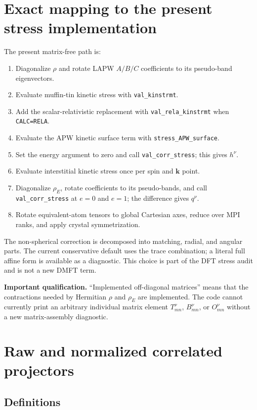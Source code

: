\documentclass[11pt]{article}
\numberwithin{equation}{section}
\newcommand{\kb}{\mathbf k}
\newcommand{\code}[1]{\texttt{#1}}
\newcommand{\status}[2]{\par\medskip\noindent\colorbox{#1}{\parbox{0.965\linewidth}{#2}}\par\medskip}
\newcommand{\warningbox}[1]{\status{lightred}{\textbf{Important qualification.} #1}}
\begin{document}
\section{Exact mapping to the present stress implementation}

The present matrix-free path is:

\begin{enumerate}
\item Diagonalize $\rho$ and rotate LAPW $A/B/C$ coefficients to its
      pseudo-band eigenvectors.
\item Evaluate muffin-tin kinetic stress with \code{val\_kinstrmt}.
\item Add the scalar-relativistic replacement with
      \code{val\_rela\_kinstrmt} when \code{CALC=RELA}.
\item Evaluate the APW kinetic surface term with
      \code{stress\_APW\_surface}.
\item Set the energy argument to zero and call
      \code{val\_corr\_stress}; this gives $h^\nu$.
\item Evaluate interstitial kinetic stress once per spin and $\kb$ point.
\item Diagonalize $\rho_E$, rotate coefficients to its pseudo-bands, and call
      \code{val\_corr\_stress} at $e=0$ and $e=1$; the difference gives
      $q^\nu$.
\item Rotate equivalent-atom tensors to global Cartesian axes, reduce over
      MPI ranks, and apply crystal symmetrization.
\end{enumerate}

The non-spherical correction is decomposed into matching, radial, and angular
parts.  The current conservative default uses the trace combination; a
literal full affine form is available as a diagnostic.  This choice is part
of the DFT stress audit and is not a new DMFT term.

\warningbox{``Implemented off-diagonal matrices'' means that the contractions
needed by Hermitian $\rho$ and $\rho_E$ are implemented.  The code cannot
currently print an arbitrary individual matrix element $T^\nu_{mn}$,
$B^\nu_{mn}$, or $O^\nu_{mn}$ without a new matrix-assembly diagnostic.}

\section{Raw and normalized correlated projectors}

\subsection{Definitions}
\end{document}
